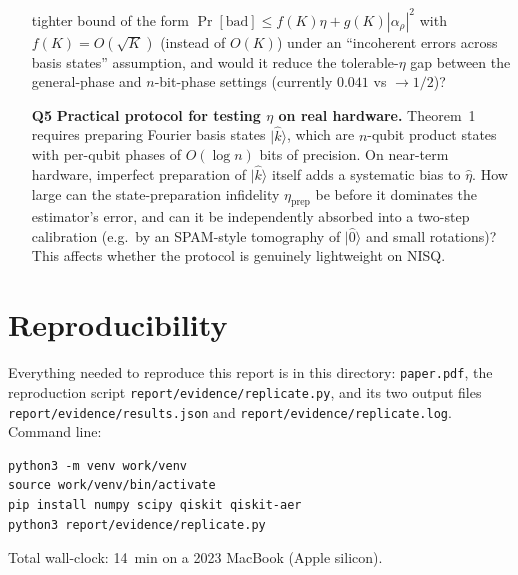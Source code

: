 \documentclass[11pt]{article}
\newcommand{\ket}[1]{\lvert #1 \rangle}
\begin{document}
\begin{enumerate}
tighter bound of the form
$\Pr[\text{bad}] \leq f(K)\eta + g(K)|\alpha_\rho|^2$ with
$f(K) = O(\sqrt{K})$ (instead of $O(K)$) under an ``incoherent errors
across basis states'' assumption, and would it reduce the tolerable-$\eta$
gap between the general-phase and $n$-bit-phase settings (currently
$0.041$ vs $\to 1/2$)?
\item[\textbf{Q5}] \textbf{Practical protocol for testing $\eta$ on
real hardware.}  Theorem~1 requires preparing Fourier basis states
$\ket{\hat k}$, which are $n$-qubit product states with per-qubit phases
of $O(\log n)$ bits of precision.  On near-term hardware, imperfect
preparation of $\ket{\hat k}$ itself adds a systematic bias to $\hat\eta$.
How large can the state-preparation infidelity $\eta_{\text{prep}}$ be
before it dominates the estimator's error, and can it be independently
absorbed into a two-step calibration (e.g.\ by an SPAM-style
tomography of $\ket{\hat 0}$ and small rotations)?  This affects whether
the protocol is genuinely lightweight on NISQ.
\end{enumerate}

\section{Reproducibility}
Everything needed to reproduce this report is in this directory:
\verb|paper.pdf|, the reproduction script
\verb|report/evidence/replicate.py|, and its two output files
\verb|report/evidence/results.json| and
\verb|report/evidence/replicate.log|.  Command line:
\begin{verbatim}
python3 -m venv work/venv
source work/venv/bin/activate
pip install numpy scipy qiskit qiskit-aer
python3 report/evidence/replicate.py
\end{verbatim}
Total wall-clock: 14~min on a 2023 MacBook (Apple silicon).
\end{document}

